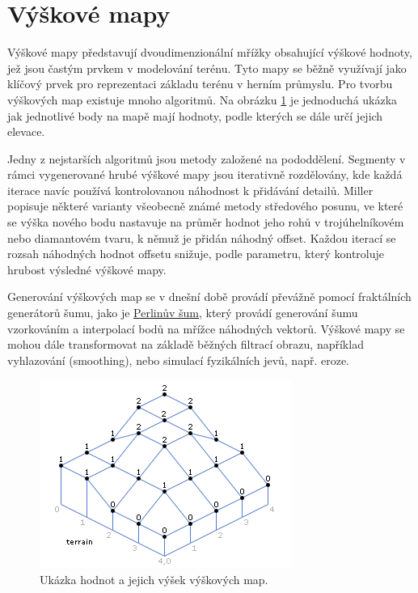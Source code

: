 \section{Výškové mapy}
\label{heightMaps}
Výškové mapy představují dvoudimenzionální mřížky obsahující výškové hodnoty, jež jsou častým prvkem v modelování terénu. Tyto mapy se běžně využívají jako klíčový prvek pro reprezentaci základu terénu v herním průmyslu. Pro tvorbu výškových map existuje mnoho algoritmů. Na obrázku \ref{HeightMap} je jednoduchá ukázka jak jednotlivé body na mapě mají hodnoty, podle kterých se dále určí jejich elevace. \cite{heightMap08}

Jedny z nejstarších algoritmů jsou metody založené na pododdělení. Segmenty v rámci vygenerované hrubé výškové mapy jsou iterativně rozdělovány, kde každá iterace navíc používá kontrolovanou náhodnost k přidávání detailů. Miller \cite{MillerRendering} popisuje některé varianty všeobecně známé metody středového posunu, ve které se výška nového bodu nastavuje na průměr hodnot jeho rohů v trojúhelníkovém nebo diamantovém tvaru, k němuž je přidán náhodný offset. Každou iterací se rozsah náhodných hodnot offsetu snižuje, podle parametru, který kontroluje hrubost výsledné výškové mapy. 

Generování výškových map se v dnešní době provádí převážně pomocí fraktálních generátorů šumu, jako je \hyperref[perlinNoise]{Perlinův šum}, který provádí generování šumu vzorkováním a interpolací bodů na mřížce náhodných vektorů. Výškové mapy se mohou dále transformovat na základě běžných filtrací obrazu, například vyhlazování (smoothing), nebo simulací fyzikálních jevů, např. eroze. \cite{inproceedings}

\begin{figure}[H]
	\centering
	\includegraphics[scale=0.9]{obrazky-figures/HeightMap.png}
	\caption{Ukázka hodnot a jejich výšek výškových map.}
	\label{HeightMap}
\end{figure}

